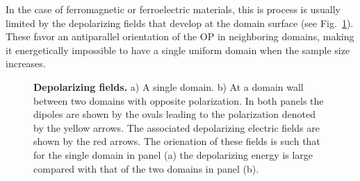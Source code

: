 In the case of ferromagnetic or ferroelectric materials, this is process is usually limited by the depolarizing fields that develop at the domain surface (see Fig.~\ref{fig:BTO_depolarizing_schematic}).
These favor an antiparallel orientation of the OP in neighboring domains, making it energetically impossible to have a single uniform domain when the sample size increases.
\begin{figure}[h]
	\caption{\label{fig:BTO_depolarizing_schematic}{\bf Depolarizing fields.} a) A single domain. b) At a domain wall between two domains with opposite polarization. In both panels the dipoles are shown by the ovals leading to the polarization denoted by the yellow arrows. The associated depolarizing electric fields are shown by the red arrows. The orienation of these fields is such that for the single domain in panel (a) the depolarizing energy is large compared with that of the two domains in panel (b).}    
\end{figure}

